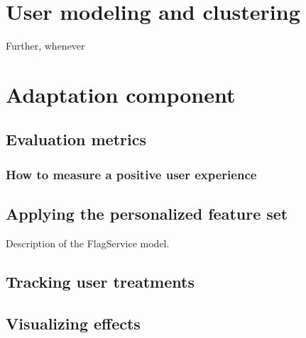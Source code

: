 
\section{User modeling and clustering} %
\label{sec:user_modeling_and_clustering}


Further, whenever


\section{Adaptation component} %
\label{sec:adaptation_component}

\subsection{Evaluation metrics} %
\label{sub:evaluation_metrics}

\subsubsection{How to measure a positive user experience} %


\subsection{Applying the personalized feature set} %
\label{sub:applying_the_personalized_feature_set}

Description of the FlagService model.


\subsection{Tracking user treatments} %
\label{sub:tracking_user_treatments}


\subsection{Visualizing effects} %
\label{sub:visualizing_effects}


